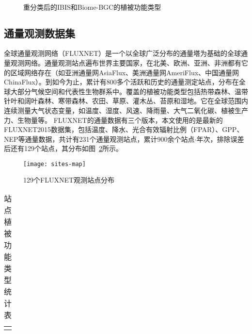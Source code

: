\begin{figure}[!h]
    \centering
    \hfill
     \\
    \caption{重分类后的IBIS和Biome-BGC的植被功能类型}
    \label{fig:carbon-cycling}
\end{figure}

\subsection{通量观测数据集}
全球通量观测网络（FLUXNET）是一个以全球广泛分布的通量塔为基础的全球通量观测网络。通量观测站点遍布世界主要国家，在北美、欧洲、亚洲、非洲都有它的区域网络存在（如亚洲通量网AsiaFlux、美洲通量网AmeriFlux、中国通量网ChinaFlux）。到如今为止，累计有800多个活跃和历史的通量测定站点，分布在全球大部分气候空间和代表性生物群系中。覆盖的植被功能类型包括热带森林、温带针叶和阔叶森林、寒带森林、农田、草原、灌木丛、苔原和湿地。它在全球范围内连续测量大气状态变量，如温度、湿度、风速、降雨量、大气二氧化碳、植被生产力、生物量等。
FLUXNET的通量数据有三个版本，本文使用的是最新的FLUXNET2015数据集，包括温度、降水、光合有效辐射比例（FPAR）、GPP、NEP等通量数据，共计有231个通量观测站点，累计900余个站点$\cdot$年次，排除误差后还有129个站点，其分布如图~\ref{fig:sites-map}所示。

\begin{figure}[!htbp]
    \centering
    \texttt{[image: sites-map]}
    \caption{129个FLUXNET观测站点分布}
    \label{fig:sites-map}
\end{figure}

\begin{table}[!htbp]
    \centering
    \caption{站点植被功能类型统计表}
    \label{tab:site-PFT-stat}
    \begin{threeparttable}
        \begin{tabular}{c}
            \Xhline{1.5pt}
            \Xhline{1.5pt}
            \Xhline{1.5pt}
        \end{tabular}
    \end{threeparttable}
\end{table}



